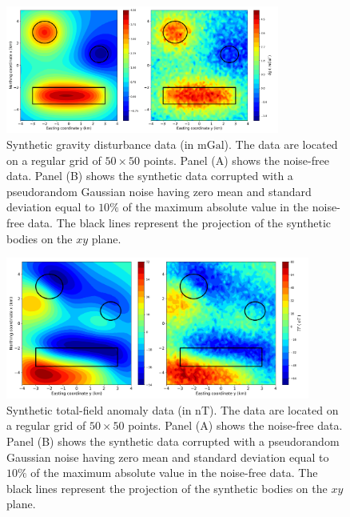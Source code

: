 
\begin{figure}[htbp]
	\begin{center}
			\includegraphics[width=9cm]{Fig/synthetic_grav}
		\end{center}
	\caption{
		Synthetic gravity disturbance data (in $\mathrm{mGal}$). 
		The data are located on a regular grid of $50 \times 50$ points. 
		Panel (A) shows the noise-free data. Panel (B) shows the synthetic data corrupted 
		with a pseudorandom Gaussian noise having zero mean and standard deviation equal to $10\%$
		of the maximum absolute value in the noise-free data.
		The black lines represent the projection of the synthetic bodies on the $xy$ plane.
		}
	\label{fig:4}
\end{figure}

\begin{figure}[htbp]
	\begin{center}
			\includegraphics[width=10cm]{Fig/synthetic_mag}
		\end{center}
	\caption{
		Synthetic total-field anomaly data (in $\mathrm{nT}$). 
		The data are located on a regular grid of $50 \times 50$ points. 
		Panel (A) shows the noise-free data. Panel (B) shows the synthetic data corrupted 
		with a pseudorandom Gaussian noise having zero mean and standard deviation equal to $10\%$
		of the maximum absolute value in the noise-free data.
		The black lines represent the projection of the synthetic bodies on the $xy$ plane.
		}
	\label{fig:7}
\end{figure}

